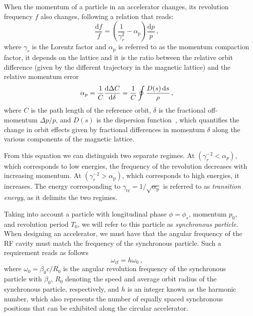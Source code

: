 When the momentum of a particle in an accelerator changes, its revolution frequency $f$ also changes, following a relation that reads:
\begin{equation}
    \frac{\mathrm{d} f}{f}=\left(\frac{1}{\gamma_r^2}-\alpha_{\mathrm{p}}\right) \frac{\mathrm{d} p}{p}\,,
\end{equation}
where $\gamma_r$ is the Lorentz factor and $\alpha_{\mathrm{p}}$ is referred to as the momentum compaction factor, it depends on the lattice and it is the ratio between the relative orbit difference (given by the different trajectory in the magnetic lattice) and the relative momentum error
\begin{equation}
    \alpha_p = \frac{1}{C}\dv{\Delta C}{\delta} = \frac{1}{C} \oint \frac{{D}(s)\,\mathrm{d}s}{\rho}\,,
\end{equation}
where $C$ is the path length of the reference orbit, $\delta$ is the fractional off-momentum $\Delta p / p$, and ${D}(s)$ is the dispersion function~\cite{Lee:2651939}, which quantifies the change in orbit effects given by fractional differences in momentum $\delta$ along the various components of the magnetic lattice.

From this equation we can distinguish two separate regimes. At $\left(\gamma_r^{-2}<\alpha_p\right)$, which corresponds to low energies, the frequency of the revolution decreases with increasing momentum. At $\left(\gamma_r^{-2}>\alpha_{\mathrm{p}}\right)$, which corresponds to high energies, it increases. The energy corresponding to $\gamma_{\mathrm{tr}}=1 / \sqrt{\alpha_{\mathrm{p}}}$ is referred to as \textit{transition energy}, as it delimits the two regimes. %

Taking into account a particle with longitudinal phase $\phi=\phi_s$, momentum $p_0$, and revolution period $T_0$, we will refer to this particle as \textit{synchronous particle}. When designing an accelerator, we must have that the angular frequency of the RF cavity must match the frequency of the synchronous particle. Such a requirement reads as follows
\begin{equation}
    \omega_{\mathrm{rf}}=h \omega_0\,,
\end{equation}
where $\omega_0=\beta_0 c / R_0$ is the angular revolution frequency of the synchronous particle with $\beta_0$, $R_0$ denoting the speed and average orbit radius of the synchronous particle, respectively, and $h$ is an integer known as the harmonic number, which also represents the number of equally spaced synchronous positions that can be exhibited along the circular accelerator.

